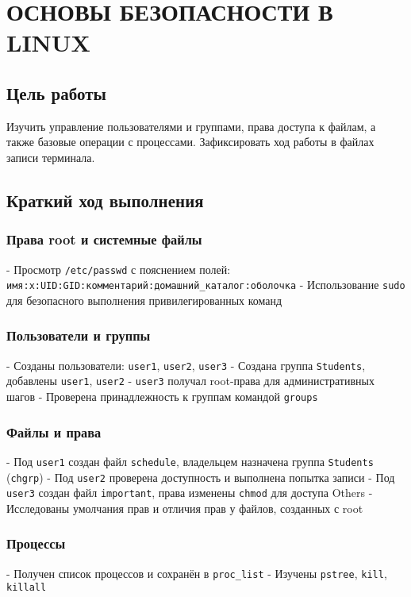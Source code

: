\chapter{ОСНОВЫ БЕЗОПАСНОСТИ В LINUX}

\section{Цель работы}
Изучить управление пользователями и группами, права доступа к файлам, а также базовые операции с процессами. Зафиксировать ход работы в файлах записи терминала.

\section{Краткий ход выполнения}
\subsection{Права root и системные файлы}
- Просмотр \texttt{/etc/passwd} с пояснением полей: \texttt{имя:х:UID:GID:комментарий:домашний\_каталог:оболочка}
- Использование \texttt{sudo} для безопасного выполнения привилегированных команд

\subsection{Пользователи и группы}
- Созданы пользователи: \texttt{user1}, \texttt{user2}, \texttt{user3}
- Создана группа \texttt{Students}, добавлены \texttt{user1}, \texttt{user2}
- \texttt{user3} получал root-права для административных шагов
- Проверена принадлежность к группам командой \texttt{groups}

\subsection{Файлы и права}
- Под \texttt{user1} создан файл \texttt{schedule}, владельцем назначена группа \texttt{Students} (\texttt{chgrp})
- Под \texttt{user2} проверена доступность и выполнена попытка записи
- Под \texttt{user3} создан файл \texttt{important}, права изменены \texttt{chmod} для доступа Others
- Исследованы умолчания прав и отличия прав у файлов, созданных с root

\subsection{Процессы}
- Получен список процессов и сохранён в \texttt{proc\_list}
- Изучены \texttt{pstree}, \texttt{kill}, \texttt{killall}



